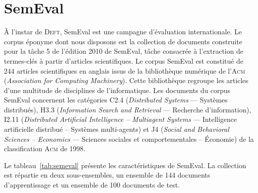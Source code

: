     \section[SemEval]{SemEval~\textnormal{\large\cite{kim2010semeval}}}
  \label{sec:main-data_description-semeval_data}
    À l'instar de \textsc{Deft}, SemEval est une campagne d'évaluation
    internationale. Le corpus éponyme dont nous disposons est la collection de
    documents construite pour la tâche 5 de l'édition 2010 de SemEval, tâche
    consacrée à l'extraction de termes-clés à partir d'articles scientifiques.
    Le corpus SemEval est constitué de 244 articles scientifiques en anglais
    issus de la bibliothèque numérique de l'\textsc{Acm} (\textit{Association
    for Computing Machinery}). Cette bibliothèque regroupe les articles d'une
    multitude de disciplines de l'informatique. Les documents du corpus SemEval
    concernent les catégories C2.4 (\textit{Distributed Systems} --- Systèmes
    distribués), H3.3 (\textit{Information Search and Retrieval} --- Recherche
    d'information), I2.11 (\textit{Distributed Artificial Intelligence --
    Multiagent Systems} --- Intelligence artificielle distribué -- Systèmes
    multi-agents) et J4 (\textit{Social and Behavioral Sciences -- Economics}
    --- Sciences sociales et comportementales -- Économie) de la classification
    \textsc{Acm} de 1998.
    
    Le tableau~\ref{tab:semeval} présente les caractéristiques de SemEval. La
    collection est répartie en deux sous-ensembles, un ensemble de 144 documents
    d'apprentissage et un ensemble de 100 documents de test. 

    \begin{table}[!h]
      \centering

      \caption{Corpus SemEval
               \label{tab:semeval}}
    \end{table}


